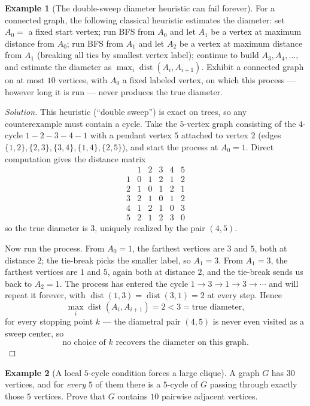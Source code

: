 \documentclass[11pt]{article}
\theoremstyle{definition}
\newtheorem{example}{Example}[section]
\begin{document}
\begin{example}[The double-sweep diameter heuristic can fail forever]
For a connected graph, the following classical heuristic estimates the diameter: set $A_0=$ a fixed start vertex; run BFS from $A_0$ and let $A_1$ be a vertex at maximum distance from $A_0$; run BFS from $A_1$ and let $A_2$ be a vertex at maximum distance from $A_1$ (breaking all ties by smallest vertex label); continue to build $A_3,A_4,\dots$, and estimate the diameter as $\max_i \operatorname{dist}(A_i,A_{i+1})$. Exhibit a connected graph on at most $10$ vertices, with $A_0$ a fixed labeled vertex, on which this process — however long it is run — never produces the true diameter.
\end{example}

\begin{proof}[Solution]
This heuristic (``double sweep'') is exact on trees, so any counterexample must contain a cycle. Take the $5$-vertex graph consisting of the $4$-cycle $1\!-\!2\!-\!3\!-\!4\!-\!1$ with a pendant vertex $5$ attached to vertex $2$ (edges $\{1,2\},\{2,3\},\{3,4\},\{1,4\},\{2,5\}$), and start the process at $A_0=1$. Direct computation gives the distance matrix
\[
\begin{array}{c|ccccc}
 & 1&2&3&4&5\\\hline
1&0&1&2&1&2\\
2&1&0&1&2&1\\
3&2&1&0&1&2\\
4&1&2&1&0&3\\
5&2&1&2&3&0
\end{array}
\]
so the true diameter is $3$, uniquely realized by the pair $(4,5)$.

Now run the process. From $A_0=1$, the farthest vertices are $3$ and $5$, both at distance $2$; the tie-break picks the smaller label, so $A_1=3$. From $A_1=3$, the farthest vertices are $1$ and $5$, again both at distance $2$, and the tie-break sends us back to $A_2=1$. The process has entered the cycle $1\to3\to1\to3\to\cdots$ and will repeat it forever, with $\operatorname{dist}(1,3)=\operatorname{dist}(3,1)=2$ at every step. Hence
\[
\max_i \operatorname{dist}(A_i,A_{i+1}) = 2 < 3 = \text{true diameter},
\]
for every stopping point $k$ — the diametral pair $(4,5)$ is never even visited as a sweep center, so
\[
\boxed{\text{no choice of } k \text{ recovers the diameter on this graph}}.
\]
\end{proof}

\begin{example}[A local $5$-cycle condition forces a large clique]
A graph $G$ has $30$ vertices, and for \emph{every} $5$ of them there is a $5$-cycle of $G$ passing through exactly those $5$ vertices. Prove that $G$ contains $10$ pairwise adjacent vertices.
\end{example}
\end{document}
